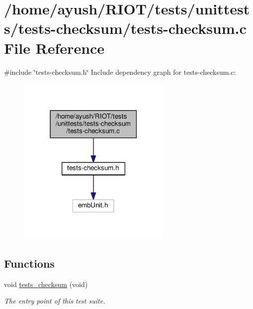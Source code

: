 \hypertarget{tests-checksum_8c}{}\section{/home/ayush/\+R\+I\+O\+T/tests/unittests/tests-\/checksum/tests-\/checksum.c File Reference}
\label{tests-checksum_8c}
{\ttfamily \#include \char`\"{}tests-\/checksum.\+h\char`\"{}}\newline
Include dependency graph for tests-\/checksum.c\+:
\nopagebreak
\begin{figure}[H]
\begin{center}
\leavevmode
\includegraphics[width=210pt]{tests-checksum_8c__incl}
\end{center}
\end{figure}
\subsection*{Functions}
\begin{DoxyCompactItemize}
\item 
void \hyperlink{group__unittests_gae22a9f38219373678e7c27dbc0011406}{tests\+\_\+checksum} (void)
\begin{DoxyCompactList}\small\item\em The entry point of this test suite. \end{DoxyCompactList}\end{DoxyCompactItemize}
